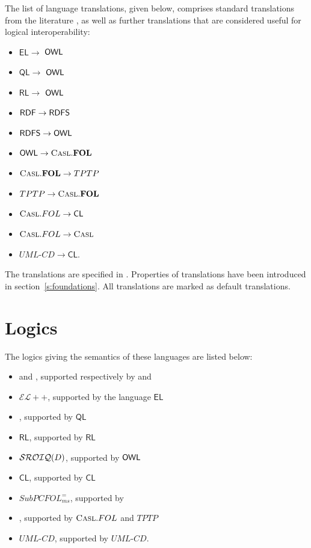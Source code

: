 \documentclass[10pt,fleqn,final]{scrreprt}
\makeatletter
\newcommand*\CommentAuthor{}
\renewcommand*\CommentAuthor{#1}}
\newcommand*\CommentDate{}
\renewcommand*\CommentDate{#1}}
\newcommand*\CommentId{}
\renewcommand*\CommentId{#1}}
\newcommand*\CommentType{}
\renewcommand*\CommentType{#1}}
\newcommand*{\SetCommentColorByType}[1]{%
\edef\localType{{#1}}%
\expandafter\ifstrequal\localType{q-aut}{\colorlet{CommentColor}{red}}{%
\expandafter\ifstrequal\localType{q-all}{\colorlet{CommentColor}{orange}}{%
\expandafter\ifstrequal\localType{todo}{\colorlet{CommentColor}{orange}}{%
\expandafter\ifstrequal\localType{fyi}{\colorlet{CommentColor}{lightgray}}{%
\colorlet{CommentColor}{yellow}}}}}}
\newcommand*{\SetCommentPrefixByType}[1]{%
\edef\localType{{#1}}%
\expandafter\@ifmtarg\localType{%
\edef\CommentPrefix{}%
}{%
\caseupper[q]{#1}%
\edef\CommentPrefix{\thestring: }%
}}
\newcommand*{\initComment}[1]{%
\setkeys{Comment}{#1}%
\SetCommentColorByType{\CommentType}%
\relax%
\SetCommentPrefixByType{\CommentType}%
\relax%
}
\newcommand*{\todonote}[2][]{%
\initComment{#1}%
\pdfcomment[author=\CommentAuthor,color=CommentColor,date=\CommentDate,id=\CommentId]{%
\CommentPrefix
#2}}
\renewcommand*{\todonote}[2][]{%
\initComment{#1}%
\ednote{\CommentPrefix #2}}
\newcommand*{\CL}{\ensuremath{\mathsf{CL}}\xspace}
\newcommand{\QL}{\ensuremath{\mathsf{QL}}\xspace}
\newcommand{\RL}{\ensuremath{\mathsf{RL}}\xspace}
\newcommand{\EL}{\ensuremath{\mathsf{EL}}\xspace}
\newcommand{\ELDL}{\ensuremath{\mathcal{EL}}\xspace}
\newcommand{\sclause}[1]{\section{#1}}
\newenvironment{definitions}[0]{\medskip }{}
\makeatother
\begin{document}
\begin{definitions}
 The list of
language translations, given below, comprises standard translations from the literature  \cite{OntoGraph,MossakowskiEtAl14b},
as well as further translations that are considered useful for
logical interoperability:
\begin{itemize}
  \item \EL $\to$ $\mathsf{OWL}$ 
  \item \QL $\to$ $\mathsf{OWL}$
  \item \RL $\to$ $\mathsf{OWL}$
  \item $\mathsf{RDF} \to \mathsf{RDFS}$
  \item $\mathsf{RDFS} \to \mathsf{OWL}$
  \item $\mathsf{OWL}  \to \textmd{\textsc{Casl}}.\mathbf{FOL}$
  \item $\textmd{\textsc{Casl}}.\mathbf{FOL} \to TPTP$
  \item $TPTP \to \textmd{\textsc{Casl}}.\mathbf{FOL}$
  \item $\CASL.FOL \to \CL$
  \item $\textmd{\textsc{Casl}}.FOL \to \textmd{\textsc{Casl}}$
  \item $UML\mbox{-}CD \to \CL$.
\end{itemize}

The translations are specified in \cite{OntoGraph,MossakowskiEtAl14b}.
Properties of translations have been introduced in section~\ref{s:foundations}.
All translations are marked as default translations. 

\sclause{Logics}

The logics giving the semantics of these languages are listed below:
\begin{itemize}
 \item \RDF and \RDFS, supported respectively by \RDF and \RDFS
 \item $\ELDL{+}{+}$, supported by the language \EL
 \item \DLLiteR, supported by \QL
 \item \RL, supported by \RL
 \item $\mathcal{SROIQ}(D)$, supported by $\mathsf{OWL}$
 \item \CL, supported by \CL
 \item $SubPCFOL^=_{ms}$, supported by \CASL
 \item \FOL, supported by $\textmd{\textsc{Casl}}.FOL$ and $TPTP$
 \item $UML\mbox{-}CD$, supported by $UML\mbox{-}CD$.
\end{itemize}


\end{definitions}
\end{document}
